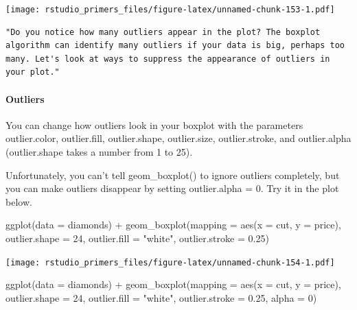 \documentclass[
]{article}
\newenvironment{Shaded}{\begin{snugshade}}{\end{snugshade}}
\newcommand{\AttributeTok}[1]{\textcolor[rgb]{0.77,0.63,0.00}{#1}}
\newcommand{\DecValTok}[1]{\textcolor[rgb]{0.00,0.00,0.81}{#1}}
\newcommand{\FloatTok}[1]{\textcolor[rgb]{0.00,0.00,0.81}{#1}}
\newcommand{\FunctionTok}[1]{\textcolor[rgb]{0.00,0.00,0.00}{#1}}
\newcommand{\NormalTok}[1]{#1}
\newcommand{\SpecialCharTok}[1]{\textcolor[rgb]{0.00,0.00,0.00}{#1}}
\newcommand{\StringTok}[1]{\textcolor[rgb]{0.31,0.60,0.02}{#1}}
\begin{document}
\texttt{[image: rstudio\_primers\_files/figure-latex/unnamed-chunk-153-1.pdf]}

\begin{verbatim}
"Do you notice how many outliers appear in the plot? The boxplot algorithm can identify many outliers if your data is big, perhaps too many. Let's look at ways to suppress the appearance of outliers in your plot."
\end{verbatim}

\hypertarget{outliers}{%
\paragraph{Outliers}\label{outliers}}

You can change how outliers look in your boxplot with the parameters
outlier.color, outlier.fill, outlier.shape, outlier.size,
outlier.stroke, and outlier.alpha (outlier.shape takes a number from 1
to 25).

Unfortunately, you can't tell geom\_boxplot() to ignore outliers
completely, but you can make outliers disappear by setting outlier.alpha
= 0. Try it in the plot below.

\begin{Shaded}
\begin{Highlighting}[]
\FunctionTok{ggplot}\NormalTok{(}\AttributeTok{data =}\NormalTok{ diamonds) }\SpecialCharTok{+}
  \FunctionTok{geom\_boxplot}\NormalTok{(}\AttributeTok{mapping =} \FunctionTok{aes}\NormalTok{(}\AttributeTok{x =}\NormalTok{ cut, }\AttributeTok{y =}\NormalTok{ price), }\AttributeTok{outlier.shape  =} \DecValTok{24}\NormalTok{, }
               \AttributeTok{outlier.fill =} \StringTok{"white"}\NormalTok{, }\AttributeTok{outlier.stroke =} \FloatTok{0.25}\NormalTok{)}
\end{Highlighting}
\end{Shaded}

\texttt{[image: rstudio\_primers\_files/figure-latex/unnamed-chunk-154-1.pdf]}

\begin{Shaded}
\begin{Highlighting}[]
\FunctionTok{ggplot}\NormalTok{(}\AttributeTok{data =}\NormalTok{ diamonds) }\SpecialCharTok{+}
  \FunctionTok{geom\_boxplot}\NormalTok{(}\AttributeTok{mapping =} \FunctionTok{aes}\NormalTok{(}\AttributeTok{x =}\NormalTok{ cut, }\AttributeTok{y =}\NormalTok{ price), }\AttributeTok{outlier.shape  =} \DecValTok{24}\NormalTok{, }
               \AttributeTok{outlier.fill =} \StringTok{"white"}\NormalTok{, }\AttributeTok{outlier.stroke =} \FloatTok{0.25}\NormalTok{, }\AttributeTok{alpha =} \DecValTok{0}\NormalTok{)}
\end{Highlighting}
\end{Shaded}
\end{document}
